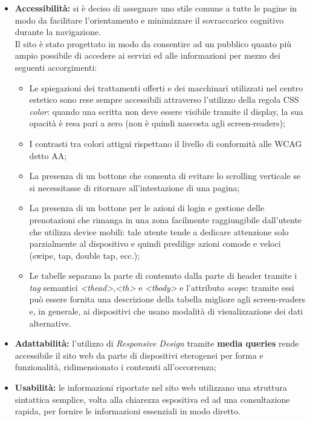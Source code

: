 \documentclass[]{article}
\begin{document}
	\begin{itemize}
		\item \textbf{Accessibilità:} si è deciso di assegnare uno stile comune a tutte le pagine in modo da facilitare l'orientamento e minimizzare il sovraccarico cognitivo durante la navigazione. \\
			Il sito è stato progettato in modo da consentire ad un pubblico quanto più ampio possibile di accedere ai servizi ed alle informazioni per mezzo dei seguenti accorgimenti:
			\begin{itemize}
				\item Le spiegazioni dei trattamenti offerti e dei macchinari utilizzati nel centro estetico sono rese sempre accessibili attraverso l'utilizzo della regola CSS \textit{color}: quando una scritta non deve essere visibile tramite il display, la sua opacità è resa pari a zero (non è quindi nascosta agli screen-readers);
				\item I contrasti tra colori attigui rispettano il livello di conformità alle WCAG detto AA;
				\item La presenza di un bottone che consenta di evitare lo scrolling verticale se si necessitasse di ritornare all'intestazione di una pagina; 
				\item La presenza di un bottone per le azioni di login e gestione delle prenotazioni che rimanga in una zona facilmente raggiungibile dall'utente che utilizza device mobili: tale utente tende a dedicare attenzione solo parzialmente al dispositivo e quindi predilige azioni comode e veloci (swipe, tap, double tap, ecc.); 						
				\item Le tabelle separano la parte di contenuto dalla parte di header tramite i \textit{tag} semantici \textit{<thead>},\textit{<th>} e \textit{<tbody>} e l'attributo \textit{scope}: tramite essi può essere fornita una descrizione della tabella migliore agli screen-readers e, in generale, ai dispositivi che usano modalità di visualizzazione dei dati alternative.
			\end{itemize}
			\item \textbf{Adattabilità:} l'utilizzo di \textit{Responsive Design} tramite \textbf{media queries} rende accessibile il sito web da parte di dispositivi eterogenei per forma e funzionalità, ridimensionato i contenuti all'occorrenza;
			\item \textbf{Usabilità:} le informazioni riportate nel sito web utilizzano una struttura sintattica semplice, volta alla chiarezza espositiva ed ad una consultazione rapida, per fornire le informazioni essenziali in modo diretto.		
	\end{itemize}
\end{document}
